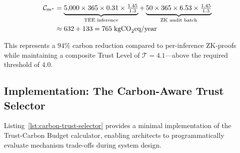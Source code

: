\begin{align}
  \mathcal{C}_{m^*}
    &= \underbrace{5{,}000 \times 365 \times 0.31
       \times \tfrac{1.45}{1.3}}_{\text{TEE inference}}
    + \underbrace{50 \times 365 \times 6.53
      \times \tfrac{1.45}{1.3}}_{\text{ZK audit batch}} \notag \\
    &\approx 632 + 133
    = 765\;\text{kgCO}_2\text{eq/year}
\end{align}

This represents a $94\%$ carbon reduction compared to
per-inference ZK-proofs while maintaining a composite
Trust Level of $\mathcal{T} = 4.1$---above the required
threshold of $4.0$.

\subsection{Implementation: The Carbon-Aware Trust Selector}
\label{subsec:carbon-aware-selector}

Listing~\ref{lst:carbon-trust-selector} provides a minimal
implementation of the Trust-Carbon Budget calculator, enabling
architects to programmatically evaluate mechanism trade-offs
during system design.

